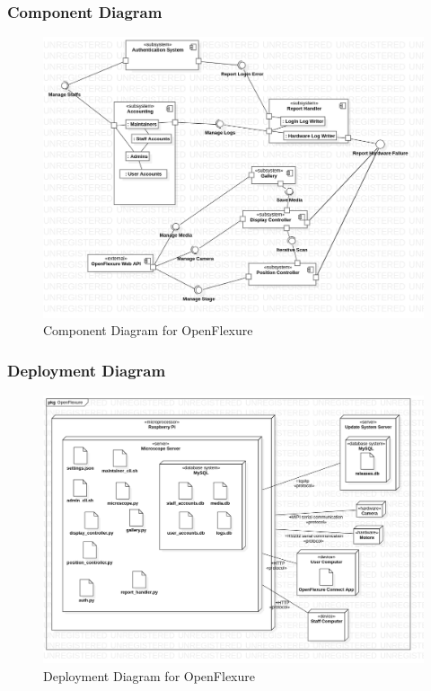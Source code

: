 \subsubsection{Component Diagram}
\begin{figure}[H]
	\centering
	\includegraphics[scale=0.4]{Uml_Images/component_diagram}
	\caption{Component Diagram for OpenFlexure}
	\label{fig:component_diagram}
\end{figure}

\subsubsection{Deployment Diagram}
\begin{figure}[H]
	\centering
	\includegraphics[scale=0.4]{Uml_Images/deployment_diagram}
	\caption{Deployment Diagram for OpenFlexure}
	\label{fig:deployment_diagram}
\end{figure}

